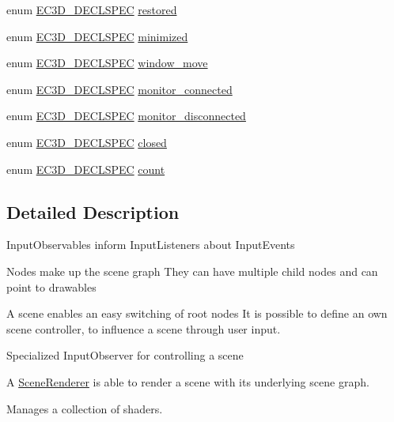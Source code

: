 \begin{DoxyCompactItemize}
enum \mbox{\hyperlink{_common_8h_aac42573e202ca3dd4d259c81691e2369}{E\+C3\+D\+\_\+\+D\+E\+C\+L\+S\+P\+EC}} \mbox{\hyperlink{namespaceec_af316093f3fa4161f332a168bd91d598e}{restored}}
\item 
enum \mbox{\hyperlink{_common_8h_aac42573e202ca3dd4d259c81691e2369}{E\+C3\+D\+\_\+\+D\+E\+C\+L\+S\+P\+EC}} \mbox{\hyperlink{namespaceec_a5886b41b06c3a2522782c1129b38569d}{minimized}}
\item 
enum \mbox{\hyperlink{_common_8h_aac42573e202ca3dd4d259c81691e2369}{E\+C3\+D\+\_\+\+D\+E\+C\+L\+S\+P\+EC}} \mbox{\hyperlink{namespaceec_a435bfb057b6ec7278b405d423194057b}{window\+\_\+move}}
\item 
enum \mbox{\hyperlink{_common_8h_aac42573e202ca3dd4d259c81691e2369}{E\+C3\+D\+\_\+\+D\+E\+C\+L\+S\+P\+EC}} \mbox{\hyperlink{namespaceec_a2a1f0b9f84e0ccf8a264a846b5ca23ff}{monitor\+\_\+connected}}
\item 
enum \mbox{\hyperlink{_common_8h_aac42573e202ca3dd4d259c81691e2369}{E\+C3\+D\+\_\+\+D\+E\+C\+L\+S\+P\+EC}} \mbox{\hyperlink{namespaceec_ac7da3b2ff7c2bb148e07798a9e8e51f4}{monitor\+\_\+disconnected}}
\item 
enum \mbox{\hyperlink{_common_8h_aac42573e202ca3dd4d259c81691e2369}{E\+C3\+D\+\_\+\+D\+E\+C\+L\+S\+P\+EC}} \mbox{\hyperlink{namespaceec_a50f9b2ea9dbfffe311ceb6f857573272}{closed}}
\item 
enum \mbox{\hyperlink{_common_8h_aac42573e202ca3dd4d259c81691e2369}{E\+C3\+D\+\_\+\+D\+E\+C\+L\+S\+P\+EC}} \mbox{\hyperlink{namespaceec_a4dc8d59c4e90842e057344aefde0efbd}{count}}
\end{DoxyCompactItemize}


\subsection{Detailed Description}
Input\+Observables inform Input\+Listeners about Input\+Events

Nodes make up the scene graph They can have multiple child nodes and can point to drawables

A scene enables an easy switching of root nodes It is possible to define an own scene controller, to influence a scene through user input.

Specialized Input\+Observer for controlling a scene

A \mbox{\hyperlink{classec_1_1_scene_renderer}{Scene\+Renderer}} is able to render a scene with its underlying scene graph.

Manages a collection of shaders.

